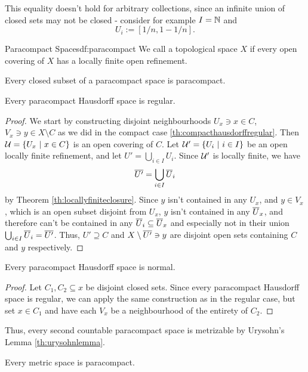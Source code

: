 \noindent
This equality doesn't hold for arbitrary collections, since an infinite union of closed sets may not be closed - consider for example $I = \mathbb{N}$ and $$U_i := [1/n, 1 - 1/n].$$
\begin{importantdefinition}{Paracompact Spaces}{df:paracompact}
	We call a topological space $X$  if every open covering of $X$ has a locally finite open refinement.
\end{importantdefinition}
\begin{exercise}
	Every closed subset of a paracompact space is paracompact.
\end{exercise}
\begin{theorem}
	Every paracompact Hausdorff space is regular.
\end{theorem}
\begin{proof}
	We start by constructing disjoint neighbourhoods $U_x \ni x \in C$, $V_x \ni y \in X \setminus C$ as we did in the compact case \ref{th:compacthausdorffregular}. Then $\mathcal{U} = \qty{U_x ~\middle|~x \in C}$ is an open covering of $C$. Let $\mathcal{U}' = \qty{U_i ~\middle|~i \in I}$ be an open locally finite refinement, and let $U' = \bigcup_{i \in I} U_i$. 
	\newpar
	Since $\mathcal{U}'$ is locally finite, we have
	\begin{align*}
		\overline{{U'}} = \bigcup_{i \in I} \overline{{U}}_i
	\end{align*}
	by Theorem \ref{th:locallyfiniteclosure}. 
	\newpar
	Since $y$ isn't contained in any $U_x$, and $y \in V_x$, which is an open subset disjoint from $U_x$, $y$ isn't contained in any $\overline{{U}}_x$, and therefore can't be contained in any $\overline{{U}}_i \subseteq \overline{{U}}_x$ and especially not in their union $\bigcup_{i \in I} \overline{{U}}_i = \overline{{U'}}$. 
	\newpar
	Thus, $U' \supseteq C$ and $X \setminus \overline{{U'}} \ni y$ are disjoint open sets containing $C$ and $y$ respectively.
\end{proof}
\begin{corollary}\label{th:paracompacthausdorffnormal}
	Every paracompact Hausdorff space is normal.
\end{corollary}
\begin{proof}
	Let $C_1, C_2 \subseteq x$ be disjoint closed sets.
	Since every paracompact Hausdorff space is regular, we can apply the same construction as in the regular case, but set $x \in C_1$ and have each $V_x$ be a neighbourhood of the entirety of $C_2$.
\end{proof}
Thus, every second countable paracompact space is metrizable by Urysohn's Lemma \ref{th:urysohnlemma}.
\begin{proposition}
	Every metric space is paracompact.
\end{proposition}
